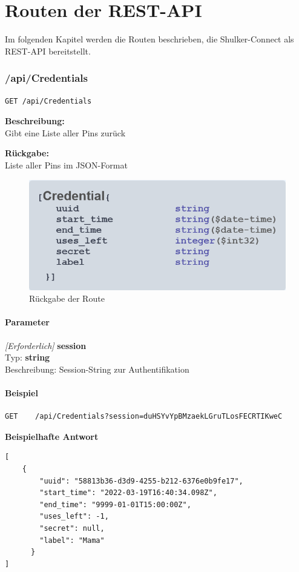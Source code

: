 \lstset{language=json}
\chapter{Routen der REST-API}
Im folgenden Kapitel werden die Routen beschrieben, die Shulker-Connect als REST-API bereitstellt.

\subsection{/api/Credentials}
\begin{lstlisting}
GET /api/Credentials
\end{lstlisting}

\textbf{Beschreibung:} \\
Gibt eine Liste aller Pins zurück

\textbf{Rückgabe:} \\
Liste aller Pins im JSON-Format

\begin{figure}[H]
    \begin{center}
        \includegraphics[width=.5\textwidth]{images/connect/routes/Credentials.png}
        \caption{Rückgabe der Route}
    \end{center}
\end{figure}

\subsubsection{Parameter}
\textit{[Erforderlich]} \textbf{session} \\
Typ: \textbf{string} \\
Beschreibung: Session-String zur Authentifikation

\subsubsection{Beispiel}
\begin{lstlisting}
GET    /api/Credentials?session=duHSYvYpBMzaekLGruTLosFECRTIKweC
\end{lstlisting}
\pagebreak
\textbf{Beispielhafte Antwort} \\
\begin{lstlisting}
[
    {
        "uuid": "58813b36-d3d9-4255-b212-6376e0b9fe17",
        "start_time": "2022-03-19T16:40:34.098Z",
        "end_time": "9999-01-01T15:00:00Z",
        "uses_left": -1,
        "secret": null,
        "label": "Mama"
      }
]
\end{lstlisting}







